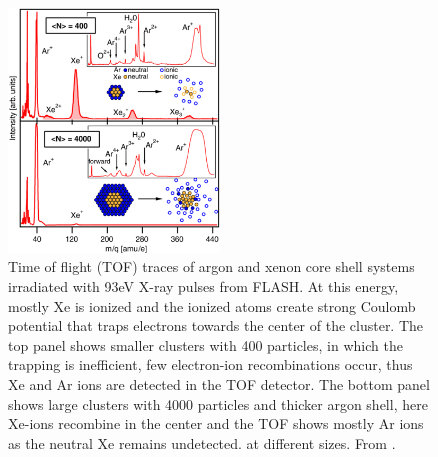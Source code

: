 \begin{figure}
	\centering
		\includegraphics[width=0.50\textwidth]{images/Hoener-image.jpg}
	\caption[Time of flight data of argon and xenon core-shell systems.]{Time of flight (TOF) traces of argon and xenon core shell systems irradiated with 93eV X-ray pulses from FLASH. At this energy, mostly Xe is ionized and the ionized atoms create strong Coulomb potential that traps electrons towards the center of the cluster. The top panel shows smaller clusters with 400 particles, in which the trapping is inefficient, few electron-ion recombinations occur, thus Xe and Ar ions are detected in the TOF detector. The bottom panel shows large clusters with 4000 particles and thicker argon shell, here Xe-ions recombine in the center and the TOF shows mostly Ar ions as the neutral Xe remains undetected. at different sizes. From \citep[\href{https://creativecommons.org/licenses/by/3.0/}{\ccby}]{Hoener-2008-JPB}.}
	\label{fig:Hoener-image}
\end{figure}
